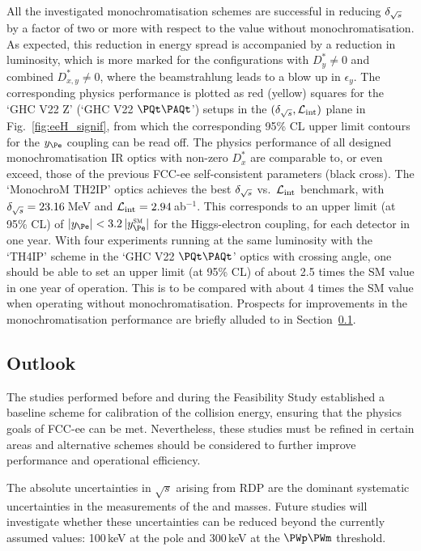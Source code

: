 All the investigated monochromatisation schemes are successful in reducing $\delta_{\sqrt{s}}$ 
by a factor of two or more with respect to the value without monochromatisation.  
As expected, this reduction in energy spread is accompanied by a reduction in luminosity, which is more marked for the configurations with $D^\ast_y \ne 0$ and combined $D^\ast_{x,y} \ne 0$, where the beamstrahlung leads to a blow up in $\epsilon_y$.   
The corresponding physics performance is plotted as red (yellow) squares for the `GHC V22 Z' (`GHC V22 $\PQt\PAQt$') setups in the $(\delta_{\sqrt{s}},\mathcal{L}_\text{int})$ plane in Fig.~\ref{fig:eeH_signif}, from which the corresponding 95\% CL upper limit contours for the $y_{\Pe}$ coupling can be read off. 
The physics performance of all designed monochromatisation IR optics with non-zero $D_{x}^{\ast}$ are comparable to, or even exceed, those of the previous FCC-ee self-consistent parameters (black cross). 
The `MonochroM TH2IP' optics achieves the best $\delta_{\sqrt{s}}$ vs.\ $\mathcal{L}_\text{int}$ benchmark, with $\delta_{\sqrt{s}} = 23.16$\,MeV and $\mathcal{L}_\text{int} = 2.94$\,ab$^{-1}$. 
This corresponds to an upper limit (at 95\% CL) of 
$\lvert y_{\Pe} \rvert < 3.2\,\lvert y^\mathrm{\textsc{sm}}_{\Pe} \rvert$ for the Higgs-electron coupling, for each detector in one year. 
With four experiments running at the same luminosity with the `TH4IP' scheme in the `GHC V22 $\PQt\PAQt$' optics with crossing angle, one should be able to set an upper limit (at 95\% CL) of about 2.5 times the SM value in one year of operation. 
This is to be  compared with about 4 times the SM value when operating without monochromatisation. 
Prospects for improvements in the monochromatisation performance are briefly alluded to in Section~\ref{sec:epol_next}.

\subsection{Outlook}
\label{sec:epol_next}

The studies performed before and during the Feasibility Study established a baseline scheme 
for calibration of the collision energy, ensuring that the physics goals of FCC-ee can be met.  
Nevertheless, these studies must be refined in certain areas
and alternative schemes should be considered to further improve performance and operational efficiency.

The absolute uncertainties in $\sqrt{s}$ arising from RDP 
are the dominant systematic uncertainties in the measurements of the \PZ and \PW masses.  
Future studies will investigate whether these uncertainties can be reduced 
beyond the currently assumed values: 100\,keV at the \PZ pole and 300\,keV at the $\PWp\PWm$ threshold.

